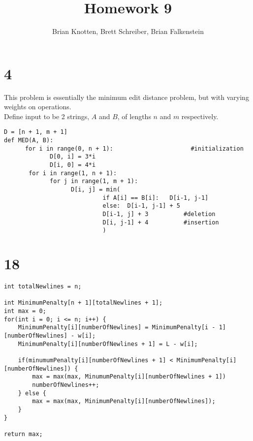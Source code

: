 \documentclass[letterpaper,notitlepage,twoside]{article}
\begin{document}
\title{Homework 9}
\author{Brian Knotten, Brett Schreiber, Brian Falkenstein}
\maketitle

\section*{4}
This problem is essentially the minimum edit distance problem, but with varying weights on operations. \\
Define input to be 2 strings, $A$ and $B$, of lengths $n$ and $m$ respectively.
\begin{verbatim}
D = [n + 1, m + 1]
def MED(A, B):
      for i in range(0, n + 1):                      #initialization 
             D[0, i] = 3*i
             D[i, 0] = 4*i
       for i in range(1, n + 1):
             for j in range(1, m + 1):
                   D[i, j] = min(
                            if A[i] == B[i]:   D[i-1, j-1]
                            else:  D[i-1, j-1] + 5
                            D[i-1, j] + 3          #deletion
                            D[i, j-1] + 4          #insertion
                            )
\end{verbatim}

\section*{18}
\begin{verbatim}
int totalNewlines = n;

int MinimumPenalty[n + 1][totalNewlines + 1];
int max = 0;
for(int i = 0; i <= n; i++) {
    MinimumPenalty[i][numberOfNewlines] = MinimumPenalty[i - 1][numberOfNewlines] - w[i];
    MinimumPenalty[i][numberOfNewlines + 1] = L - w[i];

    if(minumumPenalty[i][numberOfNewlines + 1] < MinimumPenalty[i][numberOfNewlines]) {
        max = max(max, MinumumPenalty[i][numberOfNewlines + 1])
        numberOfNewlines++;
    } else {
        max = max(max, MinimumPenalty[i][numberOfNewlines]);
    }
}

return max;
\end{verbatim}
\end{document}
